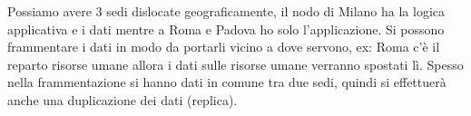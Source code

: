 Possiamo avere 3 sedi dislocate geograficamente, il nodo di Milano ha la logica applicativa
e i dati mentre a Roma e Padova ho solo l'applicazione. Si possono frammentare i
dati in modo da portarli vicino a dove servono, ex: Roma c'è il reparto risorse
umane allora i dati sulle risorse umane verranno spostati lì. Spesso nella frammentazione
si hanno dati in comune tra due sedi, quindi si effettuerà anche una duplicazione
dei dati (replica).
